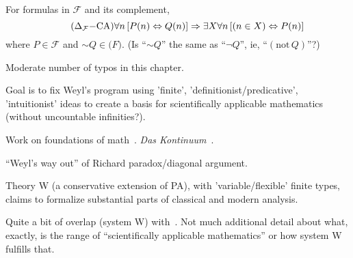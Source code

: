 For formulas in $\mathcal{F}$ and its complement,
\begin{equation}
\tag{$\Delta_{\mathcal{F}}{-}\text{CA}$}
\forall n \left[ P(n) \Leftrightarrow Q(n) \right]
\Rightarrow 
\exists X \forall n \left[ (n \in X) \Leftrightarrow P(n) \right]
\end{equation}
where $P \in \mathcal{F}$ and $\sim Q \in \mathcal(F)$.
\textsf{
(Is ``$\sim Q$'' the same as ``$\lnot Q$'', ie, 
``$(\text{not}\, Q)$''?)}

\label{sec:Weyl_vindicated}

Moderate number of typos in this 
chapter.~\cite[ch~13 ``Weyl vindicated: \textit{Das Kontinuum} seventy years later'']{Feferman1998LightOfLogic}

Goal is to fix Weyl's program 
using 'finite', 'definitionist/predicative', 'intuitionist' ideas
to create a basis for scientifically applicable mathematics
(without uncountable infinities?).

Work on foundations of math~\cite{weyl1910definitionen}.
\textit{Das Kontinuum}~\cite{weyl1918kontinuum,weyl1987continuum}.

``Weyl's way out'' of Richard paradox/diagonal 
argument.~\cite[p 262]{Feferman1998LightOfLogic} 

Theory W (a conservative extension of PA),
with 'variable/flexible' finite types,
claims to formalize substantial parts of
classical and modern 
analysis.~\cite[ch~13 sec~8]{Feferman1998LightOfLogic}

\label{sec:Why_a_little_bit_goes_a_long_way}

\cite[ch~14 ``Why a little bit goes a long way:
logical foundations of scientifically applicable mathematics'']{Feferman1998LightOfLogic}

Quite a bit of overlap (system W) 
with~\cite[ch 13]{Feferman1998LightOfLogic}.
Not much additional detail about what, exactly,
is the range of ``scientifically applicable mathematics''
or how system W fulfills that.


\label{sec:Constructivism_SEP}
\cite{sep:mathematics_constructive}

